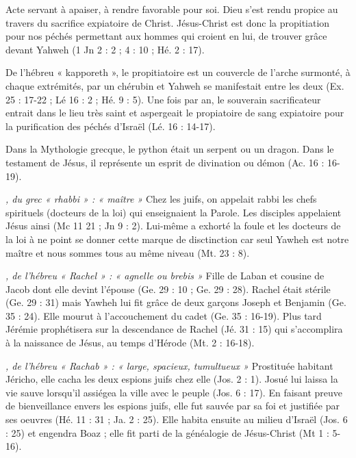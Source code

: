 \begin{multicols}{2}
\textit{}\newline
Acte servant à apaiser, à rendre favorable pour soi.
Dieu s'est rendu propice au travers du sacrifice expiatoire de Christ.
Jésus-Christ est donc la propitiation pour nos péchés permettant aux hommes qui croient en lui, de trouver grâce devant Yahweh (1 Jn 2 : 2 ; 4 : 10 ; Hé. 2 : 17).

\textit{}\newline
De l'hébreu « kapporeth », le propitiatoire est un couvercle de l'arche surmonté, à chaque extrémités, par un chérubin et Yahweh se manifestait entre les deux (Ex. 25 : 17-22 ; Lé 16 : 2 ; Hé. 9 : 5). Une fois par an, le souverain sacrificateur entrait dans le lieu très saint et aspergeait le propiatoire de sang expiatoire pour la purification des péchés d'Israël (Lé. 16 : 14-17).

\textit{}\newline
Dans la Mythologie grecque, le python était un serpent ou un dragon.
Dans le testament de Jésus, il représente un esprit de divination ou démon (Ac. 16 : 16-19).

\textit{, du grec « rhabbi » : « maître »}\newline
Chez les juifs, on appelait rabbi les chefs spirituels (docteurs de la loi) qui enseignaient la Parole. Les disciples appelaient Jésus ainsi (Mc 11 21 ; Jn 9 : 2). Lui-même a exhorté la foule et les docteurs de la loi à ne point se donner cette marque de disctinction car seul Yawheh est notre maître et nous sommes tous au même niveau (Mt. 23 : 8).

\textit{, de l'hébreu « Rachel » : « agnelle ou brebis »}\newline
Fille de Laban et cousine de Jacob dont elle devint l'épouse (Ge. 29 : 10 ; Ge. 29 : 28). Rachel était stérile (Ge. 29 : 31) mais Yawheh lui fit grâce de deux garçons Joseph et Benjamin (Ge. 35 : 24). Elle mourut à l'accouchement du cadet (Ge. 35 : 16-19). Plus tard Jérémie prophétisera sur la descendance de Rachel (Jé. 31 : 15) qui s'accomplira à la naissance de Jésus, au temps d'Hérode (Mt. 2 : 16-18).

\textit{, de l'hébreu « Rachab » : « large, spacieux, tumultueux »}\newline
Prostituée habitant Jéricho, elle cacha les deux espions juifs chez elle (Jos. 2 : 1). Josué lui laissa la vie sauve lorsqu'il assiégea la ville avec le peuple (Jos. 6 : 17). En faisant preuve de bienveillance envers les espions juifs, elle fut sauvée par sa foi et justifiée par ses oeuvres (Hé. 11 : 31 ; Ja. 2 : 25). Elle habita ensuite au milieu d'Israël (Jos. 6 : 25) et engendra Boaz ; elle fit parti de la généalogie de Jésus-Christ (Mt 1 : 5-16).


\end{multicols}
